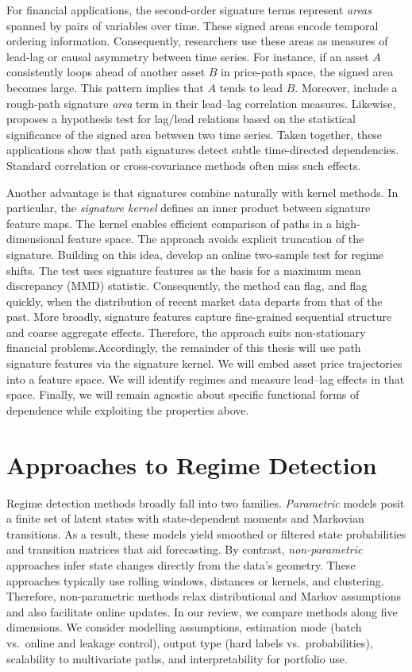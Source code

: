 For financial applications, the second-order signature terms represent \emph{areas} spanned by pairs of variables over time. These signed areas encode temporal ordering information. Consequently, researchers use these areas as measures of lead-lag or causal asymmetry between time series. For instance, if an asset $A$ consistently loops ahead of another asset $B$ in price-path space, the signed area becomes large. This pattern implies that $A$ tends to lead $B$. Moreover, \cite{bennett2022leadlag} include a rough-path signature \emph{area} term in their lead--lag correlation measures. Likewise, \cite{repec:taf:quantf:v:17:y:2017:i:6:p:959-977} proposes a hypothesis test for lag/lead relations based on the statistical significance of the signed area between two time series. Taken together, these applications show that path signatures detect subtle time-directed dependencies. Standard correlation or cross-covariance methods often miss such effects.


Another advantage is that signatures combine naturally with kernel methods. In particular, the \emph{signature kernel} defines an inner product between signature feature maps. The kernel enables efficient comparison of paths in a high-dimensional feature space. The approach avoids explicit truncation of the signature. Building on this idea, \cite{issa2023nonparametriconlinemarketregime} develop an online two-sample test for regime shifts. The test uses signature features as the basis for a maximum mean discrepancy (MMD) statistic. Consequently, the method can flag, and flag quickly, when the distribution of recent market data departs from that of the past. More broadly, signature features capture fine-grained sequential structure and coarse aggregate effects. Therefore, the approach suits non-stationary financial problems.Accordingly, the remainder of this thesis will use path signature features via the signature kernel. We will embed asset price trajectories into a feature space. We will identify regimes and measure lead--lag effects in that space. Finally, we will remain agnostic about specific functional forms of dependence while exploiting the properties above.


\section{Approaches to Regime Detection}

Regime detection methods broadly fall into two families. \emph{Parametric} models posit a finite set of latent states with state-dependent moments and Markovian transitions. As a result, these models yield smoothed or filtered state probabilities and transition matrices that aid forecasting. By contrast, \emph{non-parametric} approaches infer state changes directly from the data's geometry. These approaches typically use rolling windows, distances or kernels, and clustering. Therefore, non-parametric methods relax distributional and Markov assumptions and also facilitate online updates. In our review, we compare methods along five dimensions. We consider modelling assumptions, estimation mode (batch vs.\ online and leakage control), output type (hard labels vs.\ probabilities), scalability to multivariate paths, and interpretability for portfolio use.

